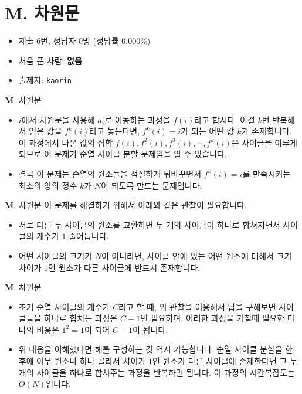 \section{M. 차원문}

\begin{frame} %
    \begin{itemize}
        \item 제출 6번, 정답자 0명 (정답률 0.000\%)
        \item 처음 푼 사람: \textbf{없음}
        \item 출제자: \texttt{kaorin}
    \end{itemize}
\end{frame}

\begin{frame}{\textbf{M}. 차원문}
    \begin{itemize}
        \item $i$에서 차원문을 사용해 $a_i$로 이동하는 과정을 $f(i)$라고 합시다. 이걸 $k$번 반복해서 얻은 값을 $f^k(i)$라고 놓는다면, $f^k(i)=i$가 되는 어떤 값 $k$가 존재합니다. 이 과정에서 나온 값의 집합 $f(i),f^2(i),f^3(i),\cdots,f^k(i)$은 사이클을 이루게 되므로 이 문제가 순열 사이클 분할 문제임을 알 수 있습니다.
        \item 결국 이 문제는 순열의 원소들을 적절하게 뒤바꾸면서 $f^k(i)=i$를 만족시키는 최소의 양의 정수 $k$가 $N$이 되도록 만드는 문제입니다.  
    \end{itemize}
\end{frame}

\begin{frame}{\textbf{M}. 차원문}
    이 문제를 해결하기 위해서 아래와 같은 관찰이 필요합니다.
    \vspace{16pt}
    \begin{itemize}
        \item 서로 다른 두 사이클의 원소를 교환하면 두 개의 사이클이 하나로 합쳐지면서 사이클의 개수가 $1$ 줄어듭니다.
        \item 어떤 사이클의 크기가 $N$이 아니라면, 사이클 안에 있는 어떤 원소에 대해서 크기 차이가 $1$인 원소가 다른 사이클에 반드시 존재합니다.
    \end{itemize}
\end{frame}

\begin{frame}{\textbf{M}. 차원문}
    \begin{itemize}
        \item 초기 순열 사이클의 개수가 $C$라고 할 때, 위 관찰을 이용해서 답을 구해보면 사이클들을 하나로 합치는 과정은 $C-1$번 필요하며, 이러한 과정을 거칠때 필요한 마나의 비용은 $1^2=1$이 되어 $C-1$이 됩니다.
        \item 위 내용을 이해했다면 해를 구성하는 것 역시 가능합니다. 순열 사이클 분할을 한 후에 아무 원소나 하나 골라서 차이가 $1$인 원소가 다른 사이클에 존재한다면 그 두개의 사이클을 하나로 합쳐주는 과정을 반복하면 됩니다. 이 과정의 시간복잡도는 $O(N)$입니다.
    \end{itemize}
\end{frame}

